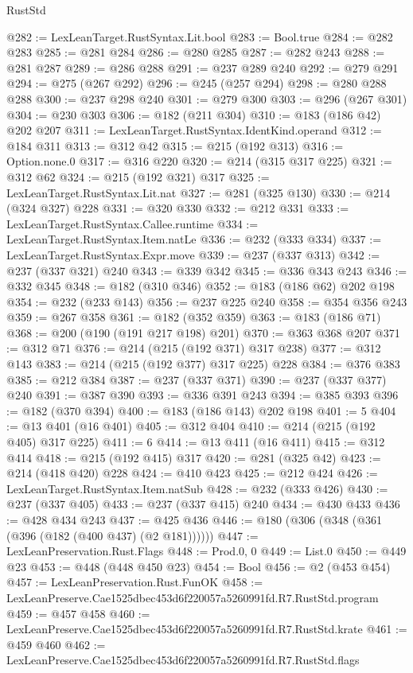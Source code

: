 \begin{lexlean}{RustStd}
\begin{coremodule}
@282 := LexLeanTarget.RustSyntax.Lit.bool
@283 := Bool.true
@284 := @282 @283
@285 := @281 @284
@286 := @280 @285
@287 := @282 @243
@288 := @281 @287
@289 := @286 @288
@291 := @237 @289 @240
@292 := @279 @291
@294 := @275 (@267 @292)
@296 := @245 (@257 @294)
@298 := @280 @288 @288
@300 := @237 @298 @240
@301 := @279 @300
@303 := @296 (@267 @301)
@304 := @230 @303
@306 := @182 (@211 @304)
@310 := @183 (@186 @42) @202 @207
@311 := LexLeanTarget.RustSyntax.IdentKind.operand
@312 := @184 @311
@313 := @312 @42
@315 := @215 (@192 @313)
@316 := Option.none.{0}
@317 := @316 @220
@320 := @214 (@315 @317 @225)
@321 := @312 @62
@324 := @215 (@192 @321) @317
@325 := LexLeanTarget.RustSyntax.Lit.nat
@327 := @281 (@325 @130)
@330 := @214 (@324 @327) @228
@331 := @320 @330
@332 := @212 @331
@333 := LexLeanTarget.RustSyntax.Callee.runtime
@334 := LexLeanTarget.RustSyntax.Item.natLe
@336 := @232 (@333 @334)
@337 := LexLeanTarget.RustSyntax.Expr.move
@339 := @237 (@337 @313)
@342 := @237 (@337 @321) @240
@343 := @339 @342
@345 := @336 @343 @243
@346 := @332 @345
@348 := @182 (@310 @346)
@352 := @183 (@186 @62) @202 @198
@354 := @232 (@233 @143)
@356 := @237 @225 @240
@358 := @354 @356 @243
@359 := @267 @358
@361 := @182 (@352 @359)
@363 := @183 (@186 @71)
@368 := @200 (@190 (@191 @217 @198) @201)
@370 := @363 @368 @207
@371 := @312 @71
@376 := @214 (@215 (@192 @371) @317 @238)
@377 := @312 @143
@383 := @214 (@215 (@192 @377) @317 @225) @228
@384 := @376 @383
@385 := @212 @384
@387 := @237 (@337 @371)
@390 := @237 (@337 @377) @240
@391 := @387 @390
@393 := @336 @391 @243
@394 := @385 @393
@396 := @182 (@370 @394)
@400 := @183 (@186 @143) @202 @198
@401 := 5
@404 := @13 @401 (@16 @401)
@405 := @312 @404
@410 := @214 (@215 (@192 @405) @317 @225)
@411 := 6
@414 := @13 @411 (@16 @411)
@415 := @312 @414
@418 := @215 (@192 @415) @317
@420 := @281 (@325 @42)
@423 := @214 (@418 @420) @228
@424 := @410 @423
@425 := @212 @424
@426 := LexLeanTarget.RustSyntax.Item.natSub
@428 := @232 (@333 @426)
@430 := @237 (@337 @405)
@433 := @237 (@337 @415) @240
@434 := @430 @433
@436 := @428 @434 @243
@437 := @425 @436
@446 := @180 (@306 (@348 (@361 (@396 (@182 (@400 @437) (@2 @181))))))
@447 := LexLeanPreservation.Rust.Flags
@448 := Prod.{0, 0}
@449 := List.{0}
@450 := @449 @23
@453 := @448 (@448 @450 @23)
@454 := Bool
@456 := @2 (@453 @454)
@457 := LexLeanPreservation.Rust.FunOK
@458 := LexLeanPreserve.Cae1525dbec453d6f220057a5260991fd.R7.RustStd.program
@459 := @457 @458
@460 := LexLeanPreserve.Cae1525dbec453d6f220057a5260991fd.R7.RustStd.krate
@461 := @459 @460
@462 := LexLeanPreserve.Cae1525dbec453d6f220057a5260991fd.R7.RustStd.flags

\end{coremodule}
\end{lexlean}
